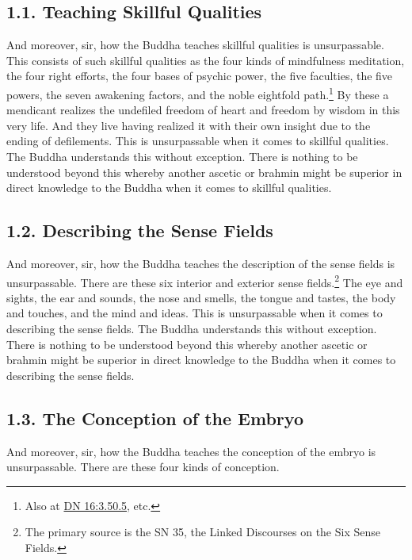 \documentclass[12pt,openany]{book}%
\begin{document}
\subsection*{1.1. Teaching Skillful Qualities }

And moreover, sir, how the Buddha teaches skillful qualities is unsurpassable. This consists of such skillful qualities as the four kinds of mindfulness meditation, the four right efforts, the four bases of psychic power, the five faculties, the five powers, the seven awakening factors, and the noble eightfold path.\footnote{Also at \href{https://suttacentral.net/dn16/en/sujato\#3.50.5}{DN 16:3.50.5}, etc. } By these a mendicant realizes the undefiled freedom of heart and freedom by wisdom in this very life. And they live having realized it with their own insight due to the ending of defilements. This is unsurpassable when it comes to skillful qualities. The Buddha understands this without exception. There is nothing to be understood beyond this whereby another ascetic or brahmin might be superior in direct knowledge to the Buddha when it comes to skillful qualities. 

\subsection*{1.2. Describing the Sense Fields }

And moreover, sir, how the Buddha teaches the description of the sense fields is unsurpassable. There are these six interior and exterior sense fields.\footnote{The primary source is the SN 35, the Linked Discourses on the Six Sense Fields. } The eye and sights, the ear and sounds, the nose and smells, the tongue and tastes, the body and touches, and the mind and ideas. This is unsurpassable when it comes to describing the sense fields. The Buddha understands this without exception. There is nothing to be understood beyond this whereby another ascetic or brahmin might be superior in direct knowledge to the Buddha when it comes to describing the sense fields. 

\subsection*{1.3. The Conception of the Embryo }

And moreover, sir, how the Buddha teaches the conception of the embryo is unsurpassable. There are these four kinds of conception. 
\end{document}
